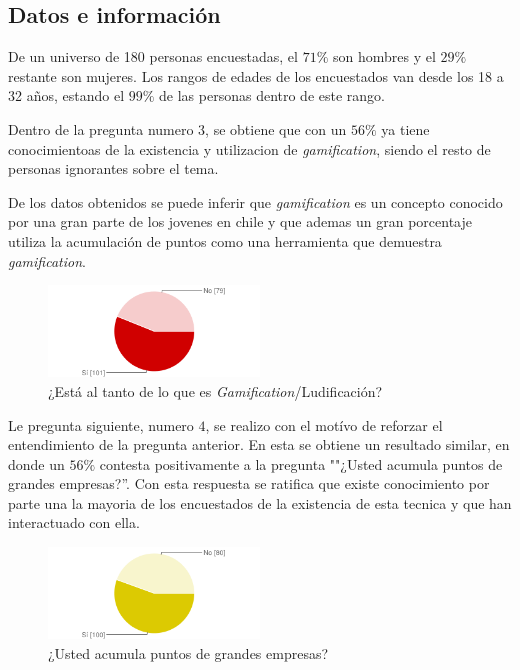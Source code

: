 \subsection{Datos e información}

De un universo de 180 personas encuestadas, el $71\%$ son hombres y el $29\%$ restante son mujeres.
Los rangos de edades de los encuestados van desde los 18 a 32 años, estando el $99\%$ de las personas
dentro de este rango.

Dentro de la pregunta numero 3, se obtiene que con un $56\%$ ya tiene conocimientoas de la existencia
y utilizacion de \emph{gamification}, siendo el resto de personas ignorantes sobre el tema.

De los datos obtenidos se puede inferir que \emph{gamification} es un concepto conocido por una gran parte
de los jovenes en chile y que ademas un gran porcentaje utiliza la acumulación de puntos como una
herramienta que demuestra \emph{gamification}.

\begin{figure}[!htb]
  \centering
  \includegraphics[width=0.5\textwidth]{images/chartPreg3.png}
  \caption[chart3]{¿Está al tanto de lo que es \emph{Gamification}/Ludificación?}
  \label{fig:chart1}
\end{figure}

Le pregunta siguiente, numero $4$, se realizo con el motívo de reforzar el entendimiento de la pregunta
anterior. En esta se obtiene un resultado similar, en donde un $56\%$ contesta positivamente a la
pregunta ""¿Usted acumula puntos de grandes empresas?''. Con esta respuesta se ratifica que existe
conocimiento por parte una la mayoria de los encuestados de la existencia de esta tecnica y que han
interactuado con ella.

\begin{figure}[!htb]
  \centering
  \includegraphics[width=0.5\textwidth]{images/chartPreg4.png}
  \caption[chart4]{¿Usted acumula puntos de grandes empresas?}
  \label{fig:chart2}
\end{figure}

